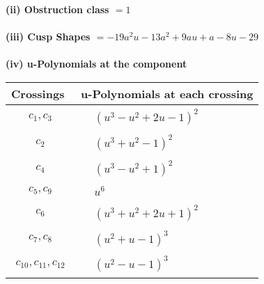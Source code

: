 \documentclass[1p]{elsarticle_modified}
\theoremstyle{definition}
\begin{document}
\flushleft \textbf{(ii) Obstruction class $= 1$}\\~\\
\flushleft \textbf{(iii) Cusp Shapes $= -19 a^2 u-13 a^2+9 a u+a-8 u-29$}\\~\\
\newpage\renewcommand{\arraystretch}{1}
\flushleft \textbf{(iv) u-Polynomials at the component}\newline \\
\begin{tabular}{m{50pt}|m{274pt}}
Crossings & \hspace{64pt}u-Polynomials at each crossing \\
\hline $$\begin{aligned}c_{1},c_{3}\end{aligned}$$&$\begin{aligned}
&(u^3- u^2+2 u-1)^2
\end{aligned}$\\
\hline $$\begin{aligned}c_{2}\end{aligned}$$&$\begin{aligned}
&(u^3+u^2-1)^2
\end{aligned}$\\
\hline $$\begin{aligned}c_{4}\end{aligned}$$&$\begin{aligned}
&(u^3- u^2+1)^2
\end{aligned}$\\
\hline $$\begin{aligned}c_{5},c_{9}\end{aligned}$$&$\begin{aligned}
&u^6
\end{aligned}$\\
\hline $$\begin{aligned}c_{6}\end{aligned}$$&$\begin{aligned}
&(u^3+u^2+2 u+1)^2
\end{aligned}$\\
\hline $$\begin{aligned}c_{7},c_{8}\end{aligned}$$&$\begin{aligned}
&(u^2+u-1)^3
\end{aligned}$\\
\hline $$\begin{aligned}c_{10},c_{11},c_{12}\end{aligned}$$&$\begin{aligned}
&(u^2- u-1)^3
\end{aligned}$\\
\hline
\end{tabular}\\~\\
\end{document}
